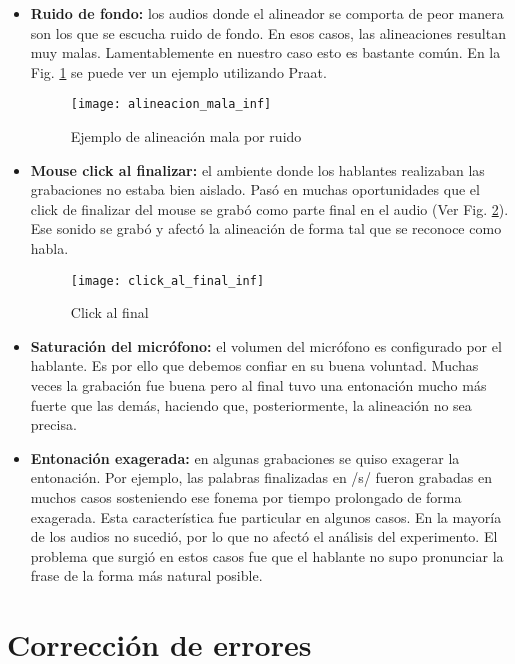 \begin{itemize}
    \item \textbf{Ruido de fondo:} los audios donde el alineador se comporta de peor manera son los que se escucha ruido de fondo. En esos casos, las alineaciones resultan muy malas. Lamentablemente en nuestro caso esto es bastante común. En la Fig. \ref{alinMala} se puede ver un ejemplo utilizando Praat.

\begin{figure}[h!]
    \centerline{\texttt{[image: alineacion\_mala\_inf]} }
    \caption{Ejemplo de alineación mala por ruido}
    \label{alinMala}
\end{figure}

    \item \textbf{Mouse click al finalizar:} el ambiente donde los hablantes realizaban las grabaciones no estaba bien aislado. Pasó en muchas oportunidades que el click de finalizar del mouse se grabó como parte final en el audio (Ver Fig. \ref{clickFinal}). Ese sonido se grabó y afectó la alineación de forma tal que se reconoce como habla.
    
\begin{figure}[h!]
    \centerline{\texttt{[image: click\_al\_final\_inf]} }
    \caption{Click al final}
    \label{clickFinal}
\end{figure}

    \item \textbf{Saturación del micrófono:} el volumen del micrófono es configurado por el hablante. Es por ello que debemos confiar en su buena voluntad. Muchas veces la grabación fue buena pero al final tuvo una entonación mucho más fuerte que las demás, haciendo que, posteriormente, la alineación no sea precisa.

    \item \textbf{Entonación exagerada:} en algunas grabaciones se quiso exagerar la entonación. Por ejemplo, las palabras finalizadas en /s/ fueron grabadas en muchos casos sosteniendo ese fonema por tiempo prolongado de forma exagerada. Esta característica fue particular en algunos casos. En la mayoría de los audios no sucedió, por lo que no afectó el análisis del experimento. El problema que surgió en estos casos fue que el hablante no supo pronunciar la frase de la forma más natural posible. 
    
\end{itemize}

\section{Corrección de errores}

